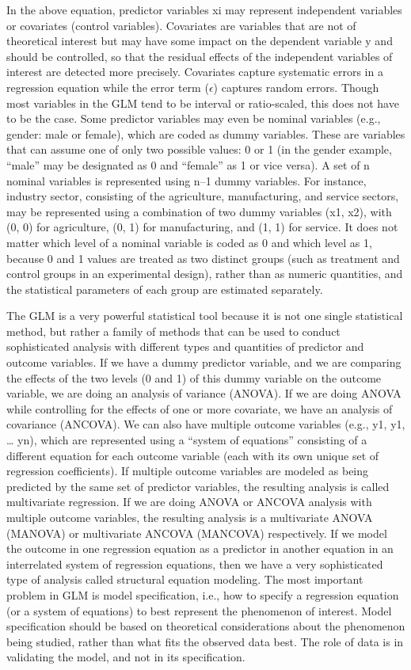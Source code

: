 In the above equation, predictor variables xi may represent independent variables or covariates (control variables). Covariates are variables that are not of theoretical interest but may have some impact on the dependent variable y and should be controlled, so that the residual effects of the independent variables of interest are detected more precisely. Covariates capture systematic errors in a regression equation while the error term ($ \epsilon $) captures random errors. Though most variables in the GLM tend to be interval or ratio-scaled, this does not have to be the case. Some predictor variables may even be nominal variables (e.g., gender: male or female), which are coded as dummy variables. These are variables that can assume one of only two possible values: 0 or 1 (in the gender example, ``male'' may be designated as 0 and ``female'' as 1 or vice versa). A set of n nominal variables is represented using n–1 dummy variables. For instance, industry sector, consisting of the agriculture, manufacturing, and service sectors, may be represented using a combination of two dummy variables (x1, x2), with (0, 0) for agriculture, (0, 1) for manufacturing, and (1, 1) for service. It does not matter which level of a nominal variable is coded as 0 and which level as 1, because 0 and 1 values are treated as two distinct groups (such as treatment and control groups in an experimental design), rather than as numeric quantities, and the statistical parameters of each group are estimated separately. 

The GLM is a very powerful statistical tool because it is not one single statistical method, but rather a family of methods that can be used to conduct sophisticated analysis with different types and quantities of predictor and outcome variables. If we have a dummy predictor variable, and we are comparing the effects of the two levels (0 and 1) of this dummy variable on the outcome variable, we are doing an analysis of variance (ANOVA). If we are doing ANOVA while controlling for the effects of one or more covariate, we have an analysis of covariance (ANCOVA). We can also have multiple outcome variables (e.g., y1, y1, … yn), which are represented using a “system of equations” consisting of a different equation for each outcome variable (each with its own unique set of regression coefficients). If multiple outcome variables are modeled as being predicted by the same set of predictor variables, the resulting analysis is called multivariate regression. If we are doing ANOVA or ANCOVA analysis with multiple outcome variables, the resulting analysis is a multivariate ANOVA (MANOVA) or multivariate ANCOVA (MANCOVA) respectively. If we model the outcome in one regression equation as a predictor in another equation in an interrelated system of regression equations, then we have a very sophisticated type of analysis called structural equation modeling. The most important problem in GLM is model specification, i.e., how to specify a regression equation (or a system of equations) to best represent the phenomenon of interest. Model specification should be based on theoretical considerations about the phenomenon being studied, rather than what fits the observed data best. The role of data is in validating the model, and not in its specification.

